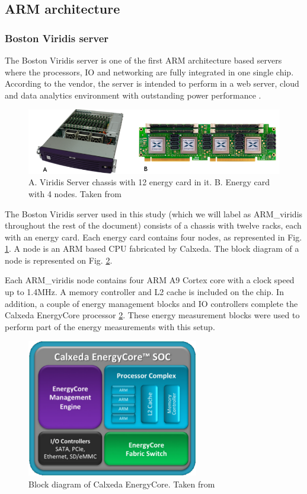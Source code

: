 \subsection{ARM architecture}
\subsubsection*{Boston Viridis server}

The Boston Viridis server is one of the first ARM architecture based servers
where the processors, IO and networking are fully integrated in one single chip.
According to the vendor, the server is intended to perform in a web server,
cloud and data analytics environment with outstanding power performance \cite{VIRIDIS}.

\begin{figure}[h!]
  \centering
    \includegraphics[width=\textwidth]{"img/viridis&SoC"}
    \caption{A. Viridis Server chassis with 12 energy card in it. B. Energy card
with 4 nodes. Taken from \cite{VIRIDIS}}
    \label{fig:viridis&SoC}
\end{figure}


The Boston Viridis server used in this study (which we will label as ARM\_viridis throughout the rest of the document) consists of a chassis with twelve racks, each with an
energy card. Each energy card contains four nodes, as represented in Fig. \ref{fig:viridis&SoC}. 
A node is an ARM based CPU fabricated by Calxeda. The block diagram of a node is represented on Fig. \ref{fig:calxedaSOC}. 

Each ARM\_viridis node contains four ARM A9 Cortex core with a clock speed up
to 1.4MHz. A memory controller and L2 cache is included on the chip. In
addition, a couple of energy management blocks and IO controllers complete the
Calxeda EnergyCore processor \ref{fig:calxedaSOC}. These energy measurement
blocks were used to perform part of the energy measurements with this setup.


\begin{figure}[h!]
  \centering
    \includegraphics[width=75mm]{"img/calxedaSOC"}
    \caption{Block diagram of Calxeda EnergyCore. Taken from \cite{VIRIDIS}}
    \label{fig:calxedaSOC}
\end{figure}


